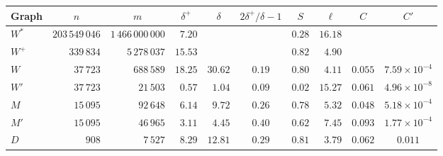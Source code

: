 \begin{tabular}{lrrrrccrcc}
\hline
Graph & \multicolumn{1}{c}{$n$} & \multicolumn{1}{c}{$m$} & \multicolumn{1}{c}{$\delta^+$} & \multicolumn{1}{c}{$\delta$}  &$2\delta^+/\delta-1$ & $S$ & \multicolumn{1}{c}{$\ell$} & $C$ & $C'$ \\
\hline
$W^*$ & $203\,549\,046$ & $1\,466\,000\,000$ & $7.20$ & & & $0.28$ & $16.18$ & & \\
$W^+$ & $339\,834$ & $5\,278\,037$ & $15.53$ & & & $0.82$ & $4.90$ & & \\
\hline
$W$ & $37\,723$ & $688\,589$ & $18.25$ & $30.62$  & $0.19$ & $0.80$ & $4.11$ & $0.055$ & $7.59\times 10^{-4}$ \\
$W'$ & $37\,723$ & $21\,503$ & $0.57$ & $1.04$  & $0.09$ & $0.02$ & $15.27$ & $0.061$ & $4.96\times10^{-8}$ \\
$M$ & $15\,095$ & $92\,648$ & $6.14$ & $9.72$  & $0.26$ & $0.78$ & $5.32$ & $0.048$ & $5.18\times10^{-4}$ \\
$M'$ & $15\,095$ & $46\,965$ & $3.11$ & $4.45$  & $0.40$ & $0.62$ & $7.45$ & $0.093$ & $1.77\times10^{-4}$ \\
$D$ & $908$ & $7\,527$ & $8.29$ & $12.81$  & $0.29$ & $0.81$ & $3.79$ & $0.062$ & $0.011$ \\
\hline
\end{tabular}
